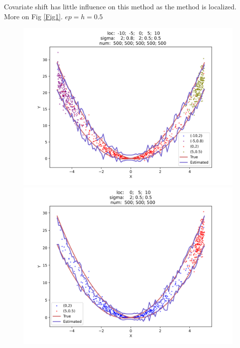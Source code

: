 \documentclass[12pt, a4paper, oneside]{article}
\begin{document}
    Covariate shift has little influence on this method as the method is localized. More on Fig \ref{Fig1}. $ep=h=0.5$
    \begin{figure}[htbp]
        \centering
        \begin{minipage}{0.495\linewidth}
            \centering
            \includegraphics[width=0.98\linewidth]{fig/Ex1_1/FULL.png}
        \end{minipage}
        \begin{minipage}{0.495\linewidth}
            \centering
            \includegraphics[width=0.98\linewidth]{fig/Ex1_1/PART.png}
        \end{minipage}
        \centering
        \begin{minipage}{0.495\linewidth}

\end{minipage}
\end{figure}
\end{document}

